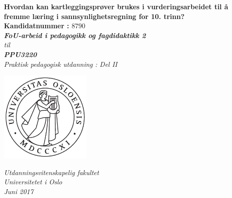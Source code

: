 \documentclass[main.tex]{subfiles}
\begin{document}
\thispagestyle{empty}
\begin{center}        %
  \vspace{5mm}        %
  \LARGE
  \textbf{Hvordan kan kartleggingsprøver brukes i vurderingsarbeidet til å fremme læring i 
          sannsynlighetsregning for 10. trinn?} \\
  \Large
  \vspace{10mm}
  \large
  \textbf{Kandidatnummer : $8790$} \\
  \vspace{20mm}
  \Large
  {\bf{\textsl{FoU-arbeid i pedagogikk og fagdidaktikk 2}}} \\
  \textsl{til} \\
  \vspace{2mm}
  {\bf{\textsl{PPU3220}}} \\
  \vspace{5mm}
  {\large \textsl {Praktisk pedagogisk utdanning : Del II}}\\
  \vspace{10mm}
  \centerline{\includegraphics[width=45mm,height=45mm]{../figures/uiosegl.pdf}} 
  \vspace{8mm}
  \textsl{Utdanningsvitenskapelig fakultet} \\
  \textsl{Universitetet i Oslo} \\
  \vspace{5mm}
  \large
  \textsl{Juni 2017} \\
  \vspace{2cm}


\end{center}
\end{document}
